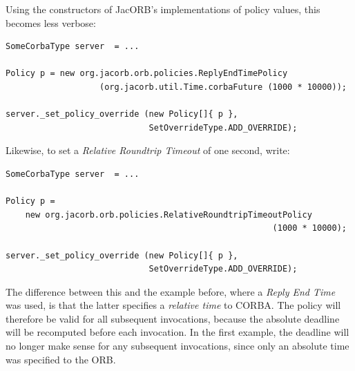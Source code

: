 Using the constructors of JacORB's implementations of policy values,
this becomes less verbose:

\begin{verbatim}
SomeCorbaType server  = ...

Policy p = new org.jacorb.orb.policies.ReplyEndTimePolicy
                   (org.jacorb.util.Time.corbaFuture (1000 * 10000));

server._set_policy_override (new Policy[]{ p },
                             SetOverrideType.ADD_OVERRIDE);
\end{verbatim}

Likewise, to set a \emph{Relative Roundtrip Timeout} of one second,
write:

\begin{verbatim}
SomeCorbaType server  = ...

Policy p =
    new org.jacorb.orb.policies.RelativeRoundtripTimeoutPolicy 
                                                      (1000 * 10000);

server._set_policy_override (new Policy[]{ p },
                             SetOverrideType.ADD_OVERRIDE);
\end{verbatim}

The difference between this and the example before, where a
\emph{Reply End Time} was used, is that the latter specifies a
\emph{relative time} to CORBA.  The policy will therefore be valid
for all subsequent invocations, because the absolute deadline will be
recomputed before each invocation.  In the first example, the
deadline will no longer make sense for any subsequent invocations,
since only an absolute time was specified to the ORB.


